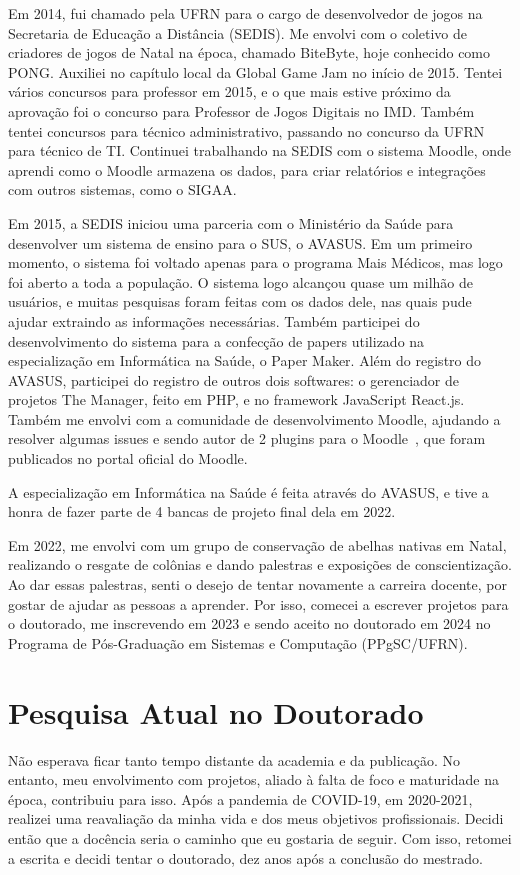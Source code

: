 \documentclass[10pt,a4paper,oneside]{book}
\begin{document}
Em 2014, fui chamado pela UFRN para o cargo de desenvolvedor de jogos na Secretaria de Educação a Distância (SEDIS).
Me envolvi com o coletivo de criadores de jogos de Natal na época, chamado BiteByte, hoje conhecido como PONG.
Auxiliei no capítulo local da Global Game Jam no início de 2015. Tentei vários concursos para professor em 2015, e o
que mais estive próximo da aprovação foi o concurso para Professor de Jogos Digitais no IMD. Também tentei concursos
para técnico administrativo, passando no concurso da UFRN para técnico de TI. Continuei trabalhando na SEDIS com o
sistema Moodle, onde aprendi como o Moodle armazena os dados, para criar relatórios e integrações com outros sistemas,
como o SIGAA.

Em 2015, a SEDIS iniciou uma parceria com o Ministério da Saúde para desenvolver um sistema de ensino para o SUS, o
AVASUS. Em um primeiro momento, o sistema foi voltado apenas para o programa Mais Médicos, mas logo foi aberto a toda
a população. O sistema logo alcançou quase um milhão de usuários, e muitas pesquisas foram feitas com os dados dele,
nas quais pude ajudar extraindo as informações necessárias. Também participei do desenvolvimento do sistema para a
confecção de papers utilizado na especialização em Informática na Saúde, o Paper Maker. Além do registro do AVASUS,
participei do registro de outros dois softwares: o gerenciador de projetos The Manager, feito em PHP, e no framework
JavaScript React.js. Também me envolvi com a comunidade de desenvolvimento Moodle, ajudando a resolver algumas issues
e sendo autor de 2 plugins para o Moodle~\cite{moodle_tool_deletemessage,moodle_tool_sentry}, que foram publicados no
portal oficial do Moodle.

A especialização em Informática na Saúde é feita através do AVASUS, e tive a honra de fazer parte de 4 bancas de projeto
final dela em 2022.

Em 2022, me envolvi com um grupo de conservação de abelhas nativas em Natal, realizando o resgate de colônias e dando
palestras e exposições de conscientização. Ao dar essas palestras, senti o desejo de tentar novamente a carreira
docente, por gostar de ajudar as pessoas a aprender. Por isso, comecei a escrever projetos para o doutorado, me
inscrevendo em 2023 e sendo aceito no doutorado em 2024 no Programa de Pós-Graduação em Sistemas e Computação (PPgSC/UFRN).




\chapter{Pesquisa Atual no Doutorado}
\label{cap_pesquisa}
Não esperava ficar tanto tempo distante da academia e da publicação. No entanto, meu envolvimento com projetos, aliado
à falta de foco e maturidade na época, contribuiu para isso.
Após a pandemia de COVID-19, em 2020-2021, realizei uma reavaliação da minha vida e dos meus objetivos profissionais.
Decidi então que a docência seria o caminho que eu gostaria de seguir. Com isso, retomei a escrita e decidi tentar o
doutorado, dez anos após a conclusão do mestrado.
\end{document}
